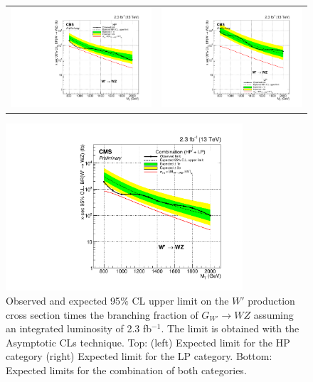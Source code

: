 \begin{figure}[!ht]
\caption{ Observed and expected 95$\%$ CL upper limit on the $W'$ production cross section times the branching fraction of $G_{W'} \rightarrow  WZ$ assuming an integrated luminosity of 2.3 fb$^{-1}$. The limit is obtained with the Asymptotic CLs technique. Top: (left) Expected limit for the HP category (right) Expected limit for the LP category. Bottom: Expected limits for the combination of both categories.}
\begin{tabular}{cc}
  \includegraphics[width=200pt]{figuresARC/limits/limitWprimeHPUB.pdf} &
  \includegraphics[width=200pt]{figuresARC/limits/limitWprimeLPUB.pdf}\\
\end{tabular}
\begin{center}
  \includegraphics[width=250pt]{figuresARC/limits/limitWprimeNPUB.pdf}
\end{center}

\label{fig:limits2}
\end{figure}

